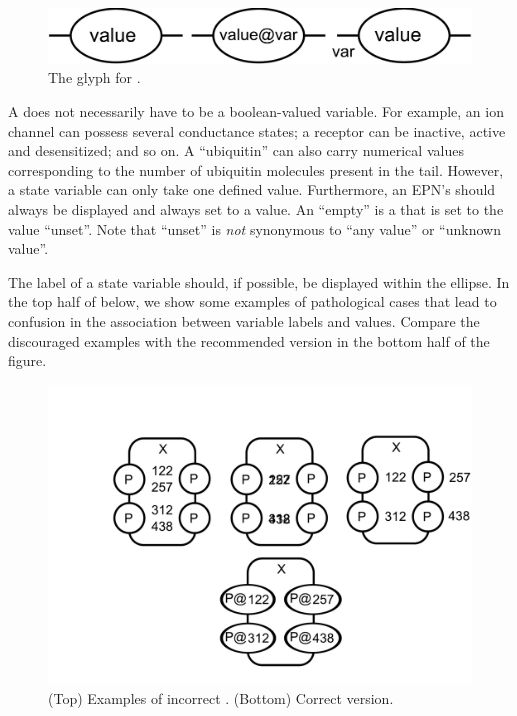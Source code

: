 \begin{figure}[H]
  \centering
  \includegraphics[scale = 0.3, trim = 0 0 0 0.25in]{images/stateVariable}
  \caption{The \PD glyph for .}
  \label{fig:state-var}
\end{figure}

A  does not necessarily have to be a boolean-valued
variable.  For example, an ion channel can possess several conductance
states; a receptor can be inactive, active and desensitized; and so on.  A
 ``ubiquitin'' can also carry numerical values
corresponding to the number of ubiquitin molecules present in the tail.
However, a state variable can only take one defined value.  Furthermore, an
EPN's  should always be displayed and always set to a
value.  An ``empty''  is a 
that is set to the value ``unset''.  Note that ``unset'' is \emph{not}
synonymous to ``any value'' or ``unknown value''.

The label of a state variable should, if possible, be displayed within the
ellipse.  In the top half of  below, we show some
examples of pathological cases that lead to confusion in the association
between variable labels and values.  Compare the discouraged examples with
the recommended version in the bottom half of the figure.

\begin{figure}[H]
  \centering
  \includegraphics[scale = 0.3, trim = 0 0.5in 0 0.75in]{examples/wrongStateVariables}
  \caption{(Top) Examples of incorrect .  (Bottom)
    Correct version.}
  \label{fig:wrong-state-var}
\end{figure}





